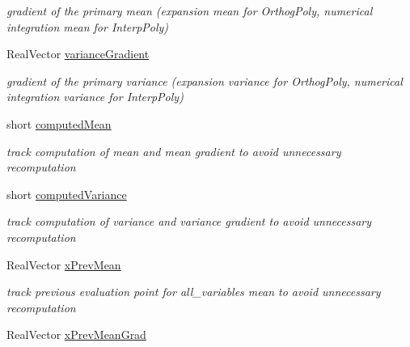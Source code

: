 \begin{DoxyCompactItemize}
\begin{DoxyCompactList}\small\item\em gradient of the primary mean (expansion mean for Orthog\+Poly, numerical integration mean for Interp\+Poly) \end{DoxyCompactList}\item 
Real\+Vector \hyperlink{classPecos_1_1PolynomialApproximation_a3769408ee078e3440e543b8fb1c31cc0}{variance\+Gradient}\label{classPecos_1_1PolynomialApproximation_a3769408ee078e3440e543b8fb1c31cc0}

\begin{DoxyCompactList}\small\item\em gradient of the primary variance (expansion variance for Orthog\+Poly, numerical integration variance for Interp\+Poly) \end{DoxyCompactList}\item 
short \hyperlink{classPecos_1_1PolynomialApproximation_a8ba5b50b82732e477573ffdaeeb65719}{computed\+Mean}\label{classPecos_1_1PolynomialApproximation_a8ba5b50b82732e477573ffdaeeb65719}

\begin{DoxyCompactList}\small\item\em track computation of mean and mean gradient to avoid unnecessary recomputation \end{DoxyCompactList}\item 
short \hyperlink{classPecos_1_1PolynomialApproximation_a6ff71a9804b99aa9d70fe94d692d1ea2}{computed\+Variance}\label{classPecos_1_1PolynomialApproximation_a6ff71a9804b99aa9d70fe94d692d1ea2}

\begin{DoxyCompactList}\small\item\em track computation of variance and variance gradient to avoid unnecessary recomputation \end{DoxyCompactList}\item 
Real\+Vector \hyperlink{classPecos_1_1PolynomialApproximation_ae5a04ee47e59e952c069781a13a29c37}{x\+Prev\+Mean}\label{classPecos_1_1PolynomialApproximation_ae5a04ee47e59e952c069781a13a29c37}

\begin{DoxyCompactList}\small\item\em track previous evaluation point for all\+\_\+variables mean to avoid unnecessary recomputation \end{DoxyCompactList}\item 
Real\+Vector \hyperlink{classPecos_1_1PolynomialApproximation_a1cab07114f59198600ba0edbdd37ba35}{x\+Prev\+Mean\+Grad}\label{classPecos_1_1PolynomialApproximation_a1cab07114f59198600ba0edbdd37ba35}


\end{DoxyCompactItemize}
